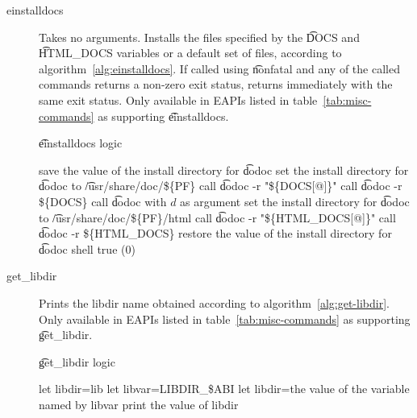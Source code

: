 \begin{description}
\item[einstalldocs]  Takes no arguments. Installs the files specified
    by the \t{DOCS} and \t{HTML_DOCS} variables or a default set of files, according to
    algorithm~\ref{alg:einstalldocs}. If called using \t{nonfatal} and any of the called commands
    returns a non-zero exit status, returns immediately with the same exit status. Only available
    in EAPIs listed in table~\ref{tab:misc-commands} as supporting \t{einstalldocs}.

\begin{algorithm}
\caption{\t{einstalldocs} logic} \label{alg:einstalldocs}
\begin{algorithmic}[1]
\STATE save the value of the install directory for \t{dodoc}
\STATE set the install directory for \t{dodoc} to \t{/usr/share/doc/\$\{PF\}}
    \STATE call \t{dodoc -r "\$\{DOCS[@]\}"}
    \STATE call \t{dodoc -r \$\{DOCS\}}
            \STATE call \t{dodoc} with $d$ as argument
        \ENDIF
    \ENDFOR
\ENDIF
\STATE set the install directory for \t{dodoc} to \t{/usr/share/doc/\$\{PF\}/html}
    \STATE call \t{dodoc -r "\$\{HTML_DOCS[@]\}"}
    \STATE call \t{dodoc -r \$\{HTML_DOCS\}}
\ENDIF
\STATE restore the value of the install directory for \t{dodoc}
\RETURN shell true (0)
\end{algorithmic}
\end{algorithm}

\item[get_libdir]  Prints the libdir name obtained according to
    algorithm~\ref{alg:get-libdir}. Only available in EAPIs listed in table~\ref{tab:misc-commands}
    as supporting \t{get_libdir}.

\begin{algorithm}
\caption{\t{get_libdir} logic} \label{alg:get-libdir}
\begin{algorithmic}[1]
\STATE let libdir=lib
    \STATE let libvar=LIBDIR_\$ABI
        \STATE let libdir=the value of the variable named by libvar
    \ENDIF
\ENDIF
\STATE print the value of libdir
\end{algorithmic}
\end{algorithm}

\end{description}

